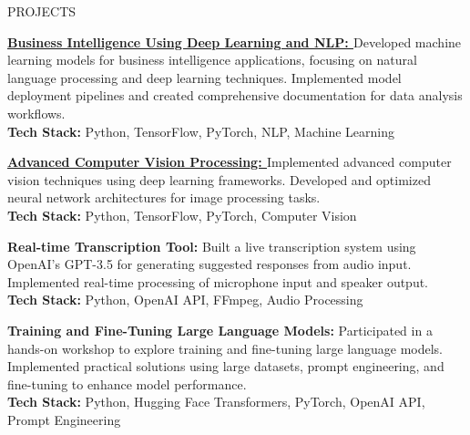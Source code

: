 \documentclass{resume} %
\begin{document}
  
 \vspace{-3mm}
\begin{rSection}{PROJECTS}
\vspace{-4mm}
\item \textbf{\href{https://github.com/vishalbansal28/Business-Intelligence-Using-Deep-Learning-and-NLP}{Business Intelligence Using Deep Learning and NLP: }}{Developed machine learning models for business intelligence applications, focusing on natural language processing and deep learning techniques. Implemented model deployment pipelines and created comprehensive documentation for data analysis workflows.}\\
\textbf{Tech Stack:} Python, TensorFlow, PyTorch, NLP, Machine Learning
 \vspace{-1.5mm}
\item \textbf{\href{https://github.com/vishalbansal28/Computer-vision-image-processing}{Advanced Computer Vision Processing: }}{Implemented advanced computer vision techniques using deep learning frameworks. Developed and optimized neural network architectures for image processing tasks.}\\
\textbf{Tech Stack:} Python, TensorFlow, PyTorch, Computer Vision
 \vspace{-1.5mm}
\item \textbf{{Real-time Transcription Tool: }}{Built a live transcription system using OpenAI's GPT-3.5 for generating suggested responses from audio input. Implemented real-time processing of microphone input and speaker output.}\\
\textbf{Tech Stack:} Python, OpenAI API, FFmpeg, Audio Processing 
\vspace{-1.5mm}
\item \textbf{{Training and Fine-Tuning Large Language Models: }}{Participated in a hands-on workshop to explore training and fine-tuning large language models. Implemented practical solutions using large datasets, prompt engineering, and fine-tuning to enhance model performance.}\\ \textbf{Tech Stack:} Python, Hugging Face Transformers, PyTorch, OpenAI API, Prompt Engineering

\end{rSection} 
   \vspace{-3mm}
\end{document}
